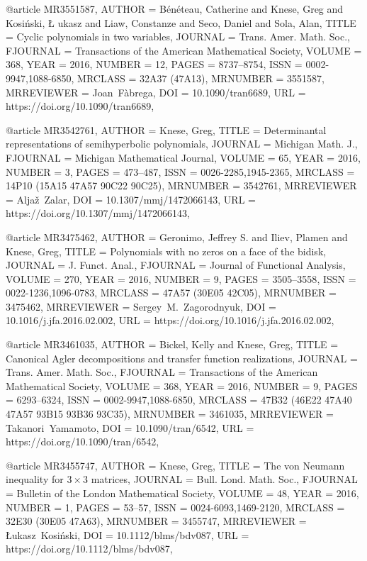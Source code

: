 @article {MR3551587,
    AUTHOR = {B\'en\'eteau, Catherine and Knese, Greg and Kosi\'nski, \L
              ukasz and Liaw, Constanze and Seco, Daniel and Sola, Alan},
     TITLE = {Cyclic polynomials in two variables},
   JOURNAL = {Trans. Amer. Math. Soc.},
  FJOURNAL = {Transactions of the American Mathematical Society},
    VOLUME = {368},
      YEAR = {2016},
    NUMBER = {12},
     PAGES = {8737--8754},
      ISSN = {0002-9947,1088-6850},
   MRCLASS = {32A37 (47A13)},
  MRNUMBER = {3551587},
MRREVIEWER = {Joan\ F\`abrega},
       DOI = {10.1090/tran6689},
       URL = {https://doi.org/10.1090/tran6689},
}

@article {MR3542761,
    AUTHOR = {Knese, Greg},
     TITLE = {Determinantal representations of semihyperbolic polynomials},
   JOURNAL = {Michigan Math. J.},
  FJOURNAL = {Michigan Mathematical Journal},
    VOLUME = {65},
      YEAR = {2016},
    NUMBER = {3},
     PAGES = {473--487},
      ISSN = {0026-2285,1945-2365},
   MRCLASS = {14P10 (15A15 47A57 90C22 90C25)},
  MRNUMBER = {3542761},
MRREVIEWER = {Alja\v z\ Zalar},
       DOI = {10.1307/mmj/1472066143},
       URL = {https://doi.org/10.1307/mmj/1472066143},
}

@article {MR3475462,
    AUTHOR = {Geronimo, Jeffrey S. and Iliev, Plamen and Knese, Greg},
     TITLE = {Polynomials with no zeros on a face of the bidisk},
   JOURNAL = {J. Funct. Anal.},
  FJOURNAL = {Journal of Functional Analysis},
    VOLUME = {270},
      YEAR = {2016},
    NUMBER = {9},
     PAGES = {3505--3558},
      ISSN = {0022-1236,1096-0783},
   MRCLASS = {47A57 (30E05 42C05)},
  MRNUMBER = {3475462},
MRREVIEWER = {Sergey\ M.\ Zagorodnyuk},
       DOI = {10.1016/j.jfa.2016.02.002},
       URL = {https://doi.org/10.1016/j.jfa.2016.02.002},
}

@article {MR3461035,
    AUTHOR = {Bickel, Kelly and Knese, Greg},
     TITLE = {Canonical {A}gler decompositions and transfer function
              realizations},
   JOURNAL = {Trans. Amer. Math. Soc.},
  FJOURNAL = {Transactions of the American Mathematical Society},
    VOLUME = {368},
      YEAR = {2016},
    NUMBER = {9},
     PAGES = {6293--6324},
      ISSN = {0002-9947,1088-6850},
   MRCLASS = {47B32 (46E22 47A40 47A57 93B15 93B36 93C35)},
  MRNUMBER = {3461035},
MRREVIEWER = {Takanori\ Yamamoto},
       DOI = {10.1090/tran/6542},
       URL = {https://doi.org/10.1090/tran/6542},
}

@article {MR3455747,
    AUTHOR = {Knese, Greg},
     TITLE = {The von {N}eumann inequality for {$3\times 3$} matrices},
   JOURNAL = {Bull. Lond. Math. Soc.},
  FJOURNAL = {Bulletin of the London Mathematical Society},
    VOLUME = {48},
      YEAR = {2016},
    NUMBER = {1},
     PAGES = {53--57},
      ISSN = {0024-6093,1469-2120},
   MRCLASS = {32E30 (30E05 47A63)},
  MRNUMBER = {3455747},
MRREVIEWER = {\L ukasz\ Kosi\'nski},
       DOI = {10.1112/blms/bdv087},
       URL = {https://doi.org/10.1112/blms/bdv087},
}


